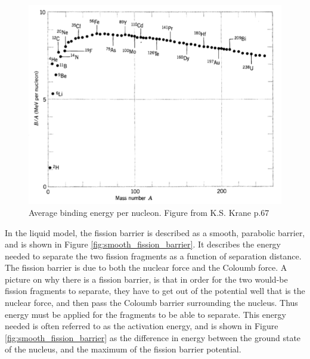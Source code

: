 \documentclass[]{article}
\begin{document}
\begin{figure} [H]
	\centering
	\includegraphics[scale=0.6]{binding_energy_per_nucleon.png}
	\caption{Average binding energy per nucleon. Figure from K.S. Krane p.67 \cite{Krane1988}}
	\label{fig:binding_energy_per_nucleon}
\end{figure}


 \noindent In the liquid model, the fission barrier is described as a smooth, parabolic barrier, and is shown in Figure \ref{fig:smooth_fission_barrier}. It describes the energy needed to separate the two fission fragments as a function of separation distance. The fission barrier is due to both the nuclear force and the Coloumb force. A picture on why there is a fission barrier, is that in order for the two would-be fission fragments to separate, they have to get out of the potential well that is the nuclear force, and then pass the Coloumb barrier surrounding the nucleus. Thus energy must be applied for the fragments to be able to separate. This energy needed is often referred to as the activation energy, and is shown in Figure \ref{fig:smooth_fission_barrier} as the difference in energy between the ground state of the nucleus, and the maximum of the fission barrier potential. 
 
 \par
 \vspace{3mm}
 
\end{document}
